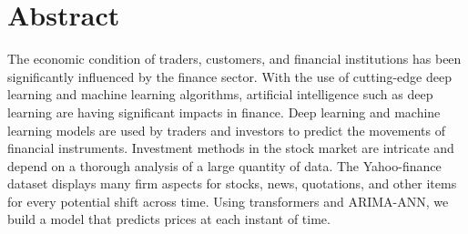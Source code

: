 \chapter*{\center \Large  Abstract}

The economic condition of traders, customers, and financial institutions has been significantly 
influenced by the finance sector. With the use of cutting-edge deep learning and machine 
learning algorithms, artificial intelligence such as deep learning are having significant impacts in finance. Deep 
learning and machine learning models are used by traders and investors to predict the movements 
of financial instruments. Investment methods in the stock market are intricate and depend on a 
thorough analysis of a large quantity of data. The Yahoo-finance dataset \citep{dataset} displays many firm 
aspects for stocks, news, quotations, and other items for every potential shift across time. 
Using transformers and ARIMA-ANN, we build a model that predicts prices at each instant of time. 

